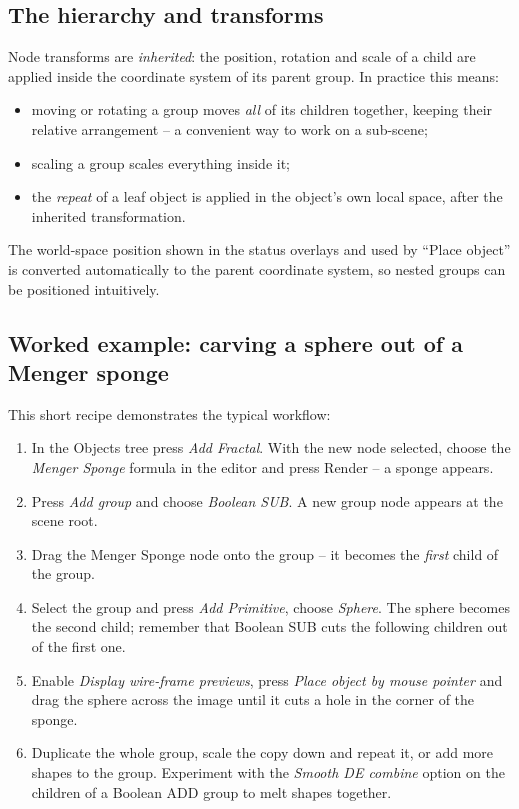 \subsection{The hierarchy and transforms}\label{objects-tree-hierarchy}

Node transforms are \emph{inherited}: the position, rotation and scale of a child are applied
inside the coordinate system of its parent group. In practice this means:

\begin{itemize}
	\item moving or rotating a group moves \emph{all} of its children together, keeping their
	relative arrangement -- a convenient way to work on a sub-scene;
	\item scaling a group scales everything inside it;
	\item the \emph{repeat} of a leaf object is applied in the object's own local space, after the
	inherited transformation.
\end{itemize}

The world-space position shown in the status overlays and used by ``Place object'' is converted
automatically to the parent coordinate system, so nested groups can be positioned intuitively.

\subsection{Worked example: carving a sphere out of a Menger sponge}\label{objects-tree-example}

This short recipe demonstrates the typical workflow:

\begin{enumerate}
	\item In the Objects tree press \emph{Add Fractal}. With the new node selected, choose the
	\emph{Menger Sponge} formula in the editor and press Render -- a sponge appears.
	\item Press \emph{Add group} and choose \emph{Boolean SUB}. A new group node appears at the
	scene root.
	\item Drag the Menger Sponge node onto the group -- it becomes the \emph{first} child of the
	group.
	\item Select the group and press \emph{Add Primitive}, choose \emph{Sphere}. The sphere becomes
	the second child; remember that Boolean SUB cuts the following children out of the first one.
	\item Enable \emph{Display wire-frame previews}, press \emph{Place object by mouse pointer} and
	drag the sphere across the image until it cuts a hole in the corner of the sponge.
	\item Duplicate the whole group, scale the copy down and repeat it, or add more shapes to the
	group. Experiment with the \emph{Smooth DE combine} option on the children of a Boolean ADD
	group to melt shapes together.
\end{enumerate}

